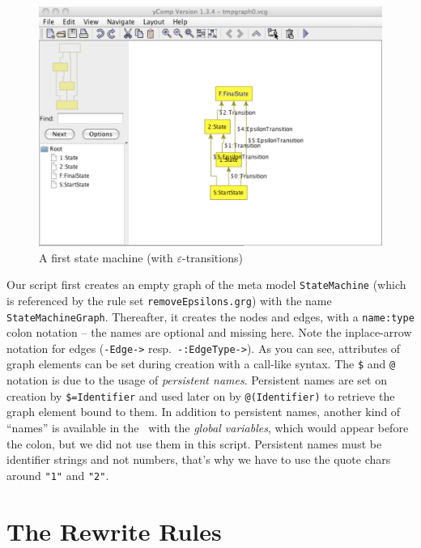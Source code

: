 \begin{figure}[htbp]
	\centering
	\includegraphics[width=0.99\linewidth]{fig/quickycomp}
	\caption{A first state machine (with $\varepsilon$-transitions)}
	\label{fig:quick:ycomp}
\end{figure}

Our script first creates an empty graph of the meta model \texttt{StateMachine} (which is referenced by the rule set \texttt{removeEpsilons.grg}) with the name \texttt{StateMachineGraph}.
Thereafter, it creates the nodes and edges, with a \texttt{name:type} colon notation -- the names are optional and missing here.
Note the inplace-arrow notation for edges (\texttt{-Edge->} resp.\ \texttt{-:EdgeType->}).
As you can see, attributes of graph elements can be set during creation with a call-like syntax.
The \texttt{\$} and \texttt{@} notation is due to the usage of \emph{persistent names}. 
Persistent names are set on creation by \texttt{\$=Identifier} and used later on by \texttt{@(Identifier)} to retrieve the graph element bound to them.
In addition to persistent names, another kind of ``names'' is available in the \GrShell\ with the \emph{global variables}, which would appear before the colon, but we did not use them in this script.
Persistent names must be identifier strings and not numbers, that's why we have to use the quote chars around \texttt{"1"} and \texttt{"2"}.

\section{The Rewrite Rules}

